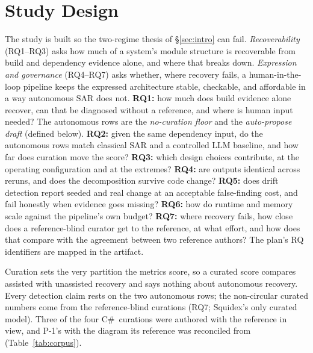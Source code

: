 \section{Study Design}
\label{sec:design}


The study is built so the two-regime thesis of \S\ref{sec:intro} can fail.
\emph{Recoverability} (RQ1--RQ3) asks how much of a system's module structure is recoverable from
build and dependency evidence alone, and where that breaks down. \emph{Expression and governance}
(RQ4--RQ7) asks whether, where recovery fails, a human-in-the-loop pipeline keeps the expressed
architecture stable, checkable, and affordable in a way autonomous SAR does not.
\textbf{RQ1:} how much does build evidence alone recover, can that be diagnosed without a
reference, and where is human input needed? The autonomous rows are the \emph{no-curation floor}
and the \emph{auto-propose draft} (defined below). \textbf{RQ2:} given the same dependency input,
do the autonomous rows match classical SAR and a controlled LLM baseline, and how far does
curation move the score? \textbf{RQ3:} which design choices contribute, at the operating
configuration and at the extremes? \textbf{RQ4:} are outputs identical across reruns, and does
the decomposition survive code change? \textbf{RQ5:} does drift detection report seeded and real
change at an acceptable false-finding cost, and fail honestly when evidence goes missing?
\textbf{RQ6:} how do runtime and memory scale against the pipeline's own budget? \textbf{RQ7:}
where recovery fails, how close does a reference-blind curator get to the reference, at what
effort, and how does that compare with the agreement between two reference authors? The plan's
RQ identifiers are mapped in the artifact.


Curation sets the very partition the metrics score, so a curated score compares assisted with
unassisted recovery and says nothing about autonomous recovery. Every detection claim rests on
the two autonomous rows; the non-circular curated numbers come from the reference-blind
curations (RQ7; Squidex's only curated model). Three of the four C\#\ curations
were authored with the reference in view, and P-1's with the diagram its reference was
reconciled from (Table~\ref{tab:corpus}).

